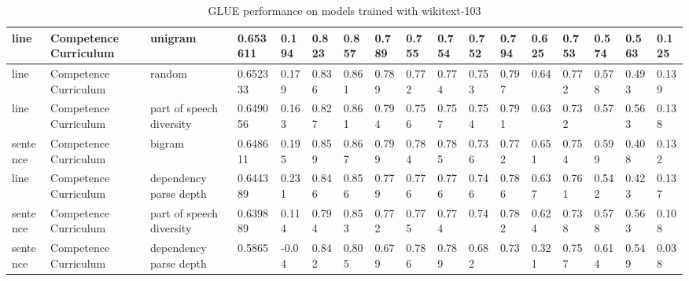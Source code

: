 \begin{table}[]
{\begin{tabular}{|l|l|l|l|l|l|l|l|l|l|l|l|l|l|l|l|l|}
line & Competence Curriculum & unigram & 0.653611 & 0.194 & 0.823 & 0.857 & 0.789 & 0.755 & 0.754 & 0.752 & 0.794 & 0.625 & 0.753 & 0.574 & 0.563 & 0.125 \\ \hline
line & Competence Curriculum & random & 0.652333 & 0.179 & 0.836 & 0.861 & 0.789 & 0.772 & 0.774 & 0.753 & 0.797 & 0.64 & 0.772 & 0.578 & 0.493 & 0.139 \\ \hline
line & Competence Curriculum & part of speech diversity & 0.649056 & 0.163 & 0.827 & 0.861 & 0.794 & 0.756 & 0.757 & 0.754 & 0.791 & 0.63 & 0.732 & 0.57 & 0.563 & 0.138 \\ \hline
sentence & Competence Curriculum & bigram & 0.648611 & 0.195 & 0.859 & 0.867 & 0.799 & 0.784 & 0.785 & 0.736 & 0.772 & 0.651 & 0.754 & 0.599 & 0.408 & 0.132 \\ \hline
line & Competence Curriculum & dependency parse depth & 0.644389 & 0.231 & 0.846 & 0.856 & 0.779 & 0.776 & 0.776 & 0.746 & 0.786 & 0.637 & 0.761 & 0.542 & 0.423 & 0.137 \\ \hline
sentence & Competence Curriculum & part of speech diversity & 0.639889 & 0.114 & 0.794 & 0.853 & 0.772 & 0.775 & 0.774 & 0.74 & 0.782 & 0.624 & 0.738 & 0.578 & 0.563 & 0.108 \\ \hline
sentence & Competence Curriculum & dependency parse depth & 0.5865 & -0.04 & 0.842 & 0.805 & 0.679 & 0.786 & 0.789 & 0.682 & 0.73 & 0.321 & 0.757 & 0.614 & 0.549 & 0.038 \\ \hline
\end{tabular}
}
\caption{GLUE performance on models trained with wikitext-103}
\label{tab:glue-wiki-103}
\end{table}

